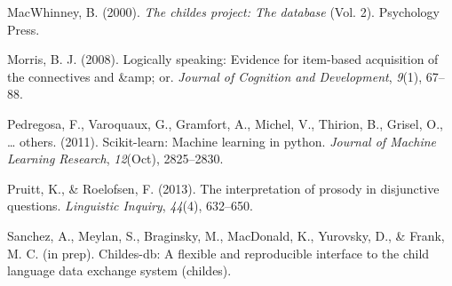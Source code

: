 \documentclass[10pt, letterpaper]{article}
\begin{document}
\hypertarget{ref-macwhinney2000childes}{}
MacWhinney, B. (2000). \emph{The childes project: The database} (Vol.
2). Psychology Press.

\hypertarget{ref-morris2008logically}{}
Morris, B. J. (2008). Logically speaking: Evidence for item-based
acquisition of the connectives and \&amp; or. \emph{Journal of Cognition
and Development}, \emph{9}(1), 67--88.

\hypertarget{ref-pedregosa2011scikit}{}
Pedregosa, F., Varoquaux, G., Gramfort, A., Michel, V., Thirion, B.,
Grisel, O., \ldots{} others. (2011). Scikit-learn: Machine learning in
python. \emph{Journal of Machine Learning Research}, \emph{12}(Oct),
2825--2830.

\hypertarget{ref-pruitt2013interpretation}{}
Pruitt, K., \& Roelofsen, F. (2013). The interpretation of prosody in
disjunctive questions. \emph{Linguistic Inquiry}, \emph{44}(4),
632--650.

\hypertarget{ref-childesdb}{}
Sanchez, A., Meylan, S., Braginsky, M., MacDonald, K., Yurovsky, D., \&
Frank, M. C. (in prep). Childes-db: A flexible and reproducible
interface to the child language data exchange system (childes).
\end{document}
